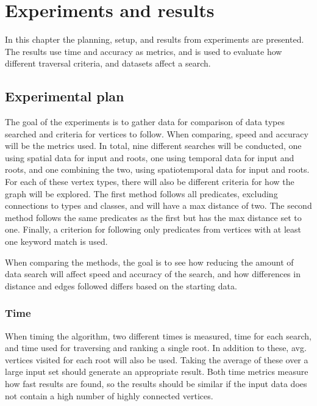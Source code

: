 \chapter{Experiments and results}
\label{cha:Experiments}
In this chapter the planning, setup, and results from experiments are presented. The results use time and accuracy as metrics, and is used to evaluate how different traversal criteria, and datasets affect a search.

\section{Experimental plan}
\label{sec:experimentalPlan}
% 
% 
The goal of the experiments is to gather data for comparison of data types searched and criteria for vertices to follow. When comparing, speed and accuracy will be the metrics used. In total, nine different searches will be conducted, one using spatial data for input and roots, one using temporal data for input and roots, and one combining the two, using spatiotemporal data for input and roots. For each of these vertex types, there will also be different criteria for how the graph will be explored. The first method follows all predicates, excluding connections to types and classes, and will have a max distance of two. The second method follows the same predicates as the first but has the max distance set to one. Finally, a criterion for following only predicates from vertices with at least one keyword match is used.

When comparing the methods, the goal is to see how reducing the amount of data search will affect speed and accuracy of the search, and how differences in distance and edges followed differs based on the starting data.

\subsection{Time}
When timing the algorithm, two different times is measured, time for each search, and time used for traversing and ranking a single root. In addition to these, avg. vertices visited for each root will also be used. Taking the average of these over a large input set should generate an appropriate result. Both time metrics measure how fast results are found, so the results should be similar if the input data does not contain a high number of highly connected vertices.

